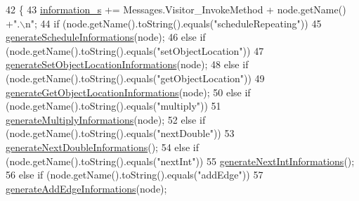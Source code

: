 \begin{DoxyCode}
42                                                 \{
43         \hyperlink{classit_1_1isislab_1_1masonhelperdocumentation_1_1visitor_1_1_step_method_visitor_adf58f8f5068e330783c3c4bd78080f1a}{information\_s} += Messages.Visitor\_InvokeMethod + node.getName() +\textcolor{stringliteral}{".\(\backslash\)n"}; 
44         \textcolor{keywordflow}{if} (node.getName().toString().equals(\textcolor{stringliteral}{"scheduleRepeating"}))
45             \hyperlink{classit_1_1isislab_1_1masonhelperdocumentation_1_1visitor_1_1_step_method_visitor_aecf5552414bc7ba6913a5e026c6048cd}{generateScheduleInformations}(node); 
46         \textcolor{keywordflow}{else} \textcolor{keywordflow}{if} (node.getName().toString().equals(\textcolor{stringliteral}{"setObjectLocation"}))
47             \hyperlink{classit_1_1isislab_1_1masonhelperdocumentation_1_1visitor_1_1_step_method_visitor_a6da0e3fe57c639de2c827068e2e57efc}{generateSetObjectLocationInformations}(node);
48         \textcolor{keywordflow}{else} \textcolor{keywordflow}{if} (node.getName().toString().equals(\textcolor{stringliteral}{"getObjectLocation"}))
49             \hyperlink{classit_1_1isislab_1_1masonhelperdocumentation_1_1visitor_1_1_step_method_visitor_a8c409c2d6cf5d87e5fdfbd8e5be90953}{generateGetObjectLocationInformations}(node);
50         \textcolor{keywordflow}{else} \textcolor{keywordflow}{if} (node.getName().toString().equals(\textcolor{stringliteral}{"multiply"}))
51             \hyperlink{classit_1_1isislab_1_1masonhelperdocumentation_1_1visitor_1_1_step_method_visitor_ae1d8e9d0a38e8ffbff89b0b40b7a562b}{generateMultiplyInformations}(node);
52         \textcolor{keywordflow}{else} \textcolor{keywordflow}{if} (node.getName().toString().equals(\textcolor{stringliteral}{"nextDouble"}))
53             \hyperlink{classit_1_1isislab_1_1masonhelperdocumentation_1_1visitor_1_1_step_method_visitor_a095db5d1d6d5551de2250d5ab6e770eb}{generateNextDoubleInformations}();
54         \textcolor{keywordflow}{else} \textcolor{keywordflow}{if} (node.getName().toString().equals(\textcolor{stringliteral}{"nextInt"}))
55             \hyperlink{classit_1_1isislab_1_1masonhelperdocumentation_1_1visitor_1_1_step_method_visitor_a758d01aa81334cc175ea359d26502452}{generateNextIntInformations}();
56         \textcolor{keywordflow}{else} \textcolor{keywordflow}{if} (node.getName().toString().equals(\textcolor{stringliteral}{"addEdge"}))
57             \hyperlink{classit_1_1isislab_1_1masonhelperdocumentation_1_1visitor_1_1_step_method_visitor_a0adcfbbf2e77a8db79f0b7cc7ca9d8f9}{generateAddEdgeInformations}(node);

\end{DoxyCode}
